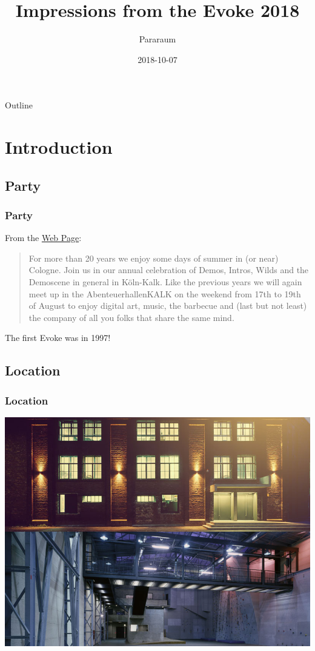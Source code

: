 \documentclass{beamer}
\title[Evoke 2018] 
{%
  Impressions from the Evoke 2018%
}
\author{Pararaum}
\date{2018-10-07}
\begin{document}
\begin{frame}
  \titlepage
\end{frame}

\begin{frame}{Outline}
  \tableofcontents
\end{frame}

\section{Introduction}

\subsection{Party}

\begin{frame}
  \frametitle{Party}

From the \href{http://evoke.eu}{Web Page}: 
\begin{quotation}
  For more than 20 years we enjoy some days of summer in (or near)
  Cologne. Join us in our annual celebration of Demos, Intros, Wilds
  and the Demoscene in general in Köln-Kalk. Like the previous years
  we will again meet up in the AbenteuerhallenKALK on the weekend from
  17th to 19th of August to enjoy digital art, music, the barbecue and
  (last but not least) the company of all you folks that share the
  same mind.
\end{quotation}

The first Evoke was in 1997!  
\end{frame}


\subsection{Location}
\begin{frame}
  \frametitle{Location}
  \includegraphics[width=\textwidth]{location}
\end{frame}
\end{document}
